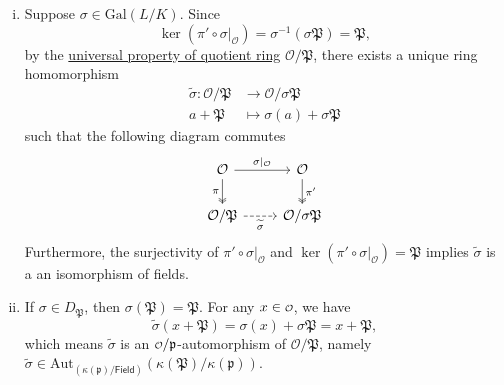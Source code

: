 \begin{prf}
    \begin{enumerate}[(i)]
        \item Suppose $\sigma \in \mathrm{Gal}(L/K)$. Since 
    \[
    \ker \left( \pi'\circ \sigma|_{\mathcal{O}}\right)=\sigma^{-1}(\sigma\mathfrak{P})=\mathfrak{P},
    \]
    by the \hyperref[th:universal_property_of_quotient_ring]{universal property of quotient ring} $\mathcal{O}/\mathfrak{P}$, there exists a unique ring homomorphism 
    \begin{align*}
        \widetilde{\sigma}:\mathcal{O}/\mathfrak{P}&\longrightarrow \mathcal{O}/\sigma\mathfrak{P}\\
        a+\mathfrak{P}&\longmapsto \sigma(a)+\sigma\mathfrak{P}
    \end{align*}
    such that the following diagram commutes
    \[
        \begin{tikzcd}
            \mathcal{O} \arrow[r, "\sigma|_{\mathcal{O}}"] \arrow[d, "\pi"', two heads] & \mathcal{O} \arrow[d, "\pi'", two heads] \\
            \mathcal{O}/\mathfrak{P} \arrow[r, "\widetilde{\sigma}"', dashed]                         & \mathcal{O}/\sigma\mathfrak{P}          
        \end{tikzcd}
    \]
    Furthermore, the surjectivity of $\pi'\circ \sigma|_{\mathcal{O}}$ and $\ker \left( \pi'\circ \sigma|_{\mathcal{O}}\right)=\mathfrak{P}$ implies $\widetilde{\sigma}$ is a an isomorphism of fields. 
    
    \item If $\sigma\in D_{\mathfrak{P}}$, then $\sigma(\mathfrak{P})=\mathfrak{P}$. For any $x\in \mathcalo$, we have
    \[
    \widetilde{\sigma}\left(x +\mathfrak{P}\right)=\sigma(x)+\sigma\mathfrak{P}=x+\mathfrak{P},
    \]
    which means $\widetilde{\sigma}$ is an $\mathcalo/\mathfrak{p}$-automorphism of $\mathcal{O}/\mathfrak{P}$, namely $\widetilde{\sigma}\in\mathrm{Aut}_{\left(\kappa(\mathfrak{p})/\mathsf{Field}\right)}\left(\kappa(\mathfrak{P})/\kappa(\mathfrak{p})\right)$.
    \end{enumerate}
\end{prf}

